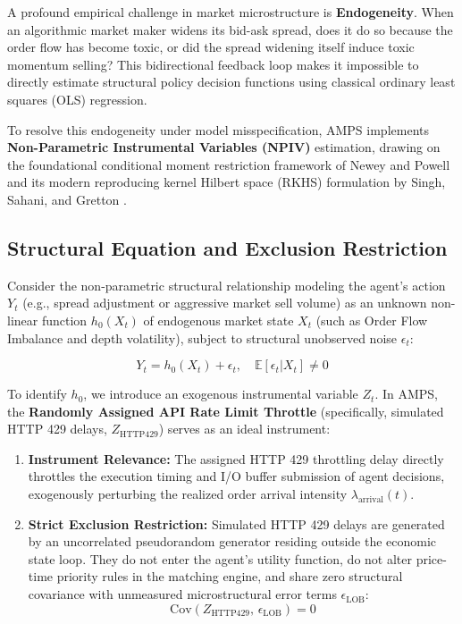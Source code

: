 A profound empirical challenge in market microstructure is \textbf{Endogeneity}. When an algorithmic market maker widens its bid-ask spread, does it do so because the order flow has become toxic, or did the spread widening itself induce toxic momentum selling? This bidirectional feedback loop makes it impossible to directly estimate structural policy decision functions using classical ordinary least squares (OLS) regression.

To resolve this endogeneity under model misspecification, AMPS implements \textbf{Non-Parametric Instrumental Variables (NPIV)} estimation, drawing on the foundational conditional moment restriction framework of Newey and Powell \cite{newey2003instrumental} and its modern reproducing kernel Hilbert space (RKHS) formulation by Singh, Sahani, and Gretton \cite{singh2019kernel}. 

\subsection{Structural Equation and Exclusion Restriction}

Consider the non-parametric structural relationship modeling the agent's action $Y_t$ (e.g., spread adjustment or aggressive market sell volume) as an unknown non-linear function $h_0(X_t)$ of endogenous market state $X_t$ (such as Order Flow Imbalance and depth volatility), subject to structural unobserved noise $\epsilon_t$:

\begin{equation}
    Y_t = h_0(X_t) + \epsilon_t, \quad \mathbb{E}[\epsilon_t | X_t] \ne 0
\end{equation}

To identify $h_0$, we introduce an exogenous instrumental variable $Z_t$. In AMPS, the \textbf{Randomly Assigned API Rate Limit Throttle} (specifically, simulated HTTP 429 delays, $Z_{\text{HTTP429}}$) serves as an ideal instrument:

\begin{enumerate}
    \item \textbf{Instrument Relevance:} The assigned HTTP 429 throttling delay directly throttles the execution timing and I/O buffer submission of agent decisions, exogenously perturbing the realized order arrival intensity $\lambda_{\text{arrival}}(t)$.
    \item \textbf{Strict Exclusion Restriction:} Simulated HTTP 429 delays are generated by an uncorrelated pseudorandom generator residing outside the economic state loop. They do not enter the agent's utility function, do not alter price-time priority rules in the matching engine, and share zero structural covariance with unmeasured microstructural error terms $\epsilon_{\text{LOB}}$:
    \begin{equation}
        \text{Cov}(Z_{\text{HTTP429}}, \, \epsilon_{\text{LOB}}) = 0
    \end{equation}
\end{enumerate}

